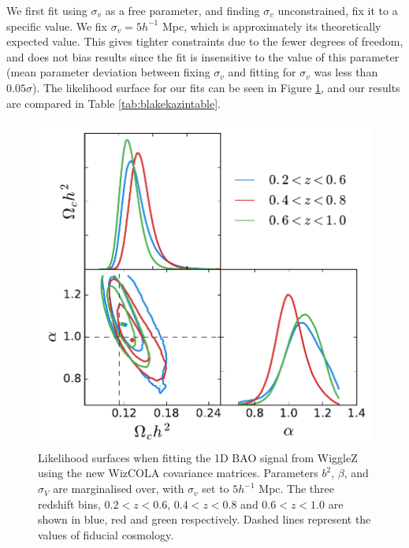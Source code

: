 \documentclass[a4paper,fleqn,usenatbib]{mnras}
\begin{document}
We first fit using $\sigma_v$ as a free parameter, and finding $\sigma_v$ unconstrained, fix it to a specific value. We fix $\sigma_v = 5 h^{-1}$ Mpc, which is approximately its theoretically expected value.  This gives tighter constraints due to the fewer degrees of freedom, and does not bias results since the fit is insensitive to the value of this parameter (mean parameter deviation between fixing $\sigma_v$ and fitting for $\sigma_v$ was less than $0.05\sigma$). The likelihood surface for our fits can be seen in Figure \ref{fig:fmonopole}, and our results are compared in Table \ref{tab:blakekazintable}. 


\begin{figure}
	\begin{center}
		\includegraphics[width=\columnwidth]{fMonpole.pdf}
	\end{center}
	\caption{Likelihood surfaces when fitting the 1D BAO signal from WiggleZ using the new WizCOLA covariance matrices. Parameters $b^2$, $\beta$, and $\sigma_V$ are marginalised over, with $\sigma_v$ set to $5 h^{-1}$ Mpc. The three redshift bins, $0.2<z<0.6$, $0.4<z<0.8$ and $0.6<z<1.0$ are shown in blue, red and green respectively. Dashed lines represent the values of fiducial cosmology.}
	\label{fig:fmonopole}
\end{figure}
\end{document}
